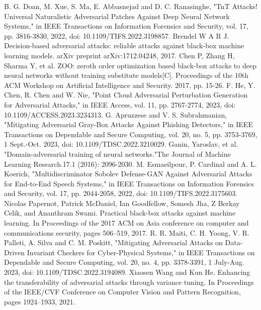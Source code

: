 \documentclass[twocolumn]{ctexart}
\begin{document}
%	
	\begin{thebibliography}{00}
		B. G. Doan, M. Xue, S. Ma, E. Abbasnejad and D. C. Ranasinghe, "TnT Attacks! Universal Naturalistic Adversarial Patches Against Deep Neural Network Systems," in IEEE Transactions on Information Forensics and Security, vol. 17, pp. 3816-3830, 2022, doi: 10.1109/TIFS.2022.3198857.
		Brendel W A R J. Decision-based adversarial attacks: reliable attacks against black-box machine learning models. arXiv preprint arXiv:1712.04248, 2017.
		Chen P, Zhang H, Sharma Y, et al. ZOO: zeroth order optimization based black-box attacks to deep neural networks without training substitute models[C]. Proceedings of the 10th ACM Workshop on Artificial Intelligence and Security. 2017, pp. 15-26.
		F. He, Y. Chen, R. Chen and W. Nie, "Point Cloud Adversarial Perturbation Generation for Adversarial Attacks," in IEEE Access, vol. 11, pp. 2767-2774, 2023, doi: 10.1109/ACCESS.2023.3234313.
		G. Apruzzese and V. S. Subrahmanian, "Mitigating Adversarial Gray-Box Attacks Against Phishing Detectors," in IEEE Transactions on Dependable and Secure Computing, vol. 20, no. 5, pp. 3753-3769, 1 Sept.-Oct. 2023, doi: 10.1109/TDSC.2022.3210029.
		Ganin, Yaroslav, et al. "Domain-adversarial training of neural networks."The Journal of Machine Learning Research.17.1 (2016): 2096-2030.
		M. Esmaeilpour, P. Cardinal and A. L. Koerich, "Multidiscriminator Sobolev Defense-GAN Against Adversarial Attacks for End-to-End Speech Systems," in IEEE Transactions on Information Forensics and Security, vol. 17, pp. 2044-2058, 2022, doi: 10.1109/TIFS.2022.3175603.
		Nicolas Papernot, Patrick McDaniel, Ian Goodfellow, Somesh Jha, Z Berkay Celik, and Ananthram Swami. Practical black-box attacks against machine learning. In Proceedings of the 2017 ACM on Asia conference on computer and communications security, pages 506–519, 2017.
		R. R. Maiti, C. H. Yoong, V. R. Palleti, A. Silva and C. M. Poskitt, "Mitigating Adversarial Attacks on Data-Driven Invariant Checkers for Cyber-Physical Systems," in IEEE Transactions on Dependable and Secure Computing, vol. 20, no. 4, pp. 3378-3391, 1 July-Aug. 2023, doi: 10.1109/TDSC.2022.3194089.
		Xiaosen Wang and Kun He. Enhancing the transferability of adversarial attacks through variance tuning. In Proceedings of the IEEE/CVF Conference on Computer Vision and Pattern Recognition, pages 1924–1933, 2021.
		
	\end{thebibliography}
\end{document}
